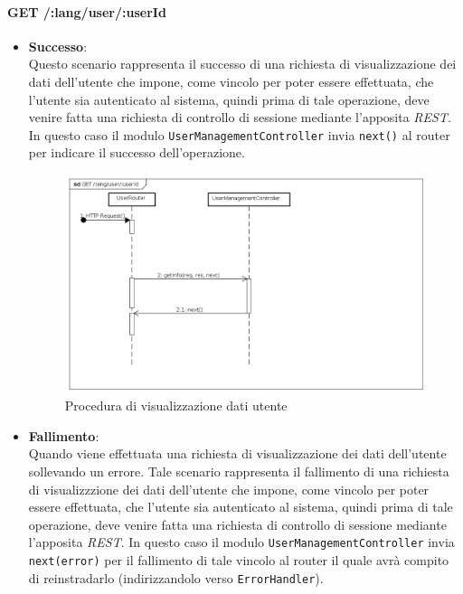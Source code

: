 \paragraph{GET /:lang/user/:userId}
\begin{itemize}
\item \textbf{Successo}:\\
Questo scenario rappresenta il successo di una richiesta di visualizzazione dei dati dell'utente che impone, come vincolo per poter essere effettuata, che l'utente sia autenticato al sistema, quindi prima di tale operazione, deve venire fatta una richiesta di controllo di sessione mediante l'apposita \textit{REST}.  
In questo caso il modulo \texttt{UserManagementController} invia \texttt{next()} al router per indicare il successo dell'operazione.

\label{Procedura di visualizzazione dati utente}
\begin{figure}[ht]
	\centering
	\includegraphics[scale=0.40]{UML/DiagrammiDiSequenza/Back-end/GET_LangUserUserIdSuccess.png}
	\caption{Procedura di visualizzazione dati utente}
\end{figure}

\FloatBarrier

\item \textbf{Fallimento}:
\\
Quando viene effettuata una richiesta di visualizzazione dei dati dell'utente sollevando un errore. Tale scenario rappresenta il fallimento di una richiesta di visualizzzione dei dati dell'utente che impone, come vincolo per poter essere effettuata, che l'utente sia autenticato al sistema, quindi prima di tale operazione, deve venire fatta una richiesta di controllo di sessione mediante l'apposita \textit{REST}. In questo caso il modulo \texttt{UserManagementController} invia \texttt{next(error)} per il fallimento di tale vincolo al router il quale avrà compito di reinstradarlo (indirizzandolo verso \texttt{ErrorHandler}).


\end{itemize}
